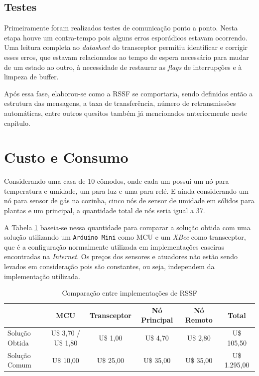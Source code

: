 {\subsection{Testes}
Primeiramente foram realizados testes de comunicação ponto a ponto. Nesta etapa houve um contra-tempo pois
alguns erros esporádicos estavam ocorrendo. Uma leitura completa ao \textit{datasheet} do transceptor permitiu
identificar e corrigir esses erros, que estavam relacionados ao tempo de espera necessário para mudar de um
estado ao outro, à necessidade de restaurar as \textit{flags} de interrupções e à limpeza de buffer.

Após essa fase, elaborou-se como a RSSF se comportaria, sendo definidos então a estrutura das mensagens, a
taxa de transferência, número de retransmissões automáticas, entre outros quesitos também já mencionados
anteriormente neste capítulo.

\section{Custo e Consumo}
Considerando uma casa de 10 cômodos, onde cada um possui um nó para temperatura e umidade, um para luz e uma
para relé. E ainda considerando um nó para sensor de gás na cozinha, cinco nós de sensor de umidade em sólidos
para plantas e um principal, a quantidade total de nós seria igual a 37.

A Tabela \ref{quadro:compare} baseia-se nessa quantidade para comparar a solução obtida com uma solução
utilizando um \texttt{Arduino Mini} como MCU e um \textit{XBee} como transceptor, que é a configuração
normalmente utilizada em implementações caseiras encontradas na \textit{Internet}. Os preços dos sensores e
atuadores não estão sendo levados em consideração pois são constantes, ou seja, independem da implementação
utilizada.

\begin{table}[H]
	\centering
	\resizebox{\textwidth}{!} {
		\begin{tabular}{l|c|c|c|c|c|}
		\cline{2-6}
		& MCU & Transceptor & Nó Principal & Nó Remoto & Total \\ \hline
		\multicolumn{1}{|l|}{Solução Obtida} & U\$ 3,70 / U\$ 1,80 & U\$ 1,00    & U\$ 4,70     & U\$
		2,80  & U\$ 105,50    \\ \hline
		\multicolumn{1}{|l|}{Solução Comum}  & U\$ 10,00         & U\$ 25,00   & U\$ 35,00    & U\$ 35,00 & U\$ 1.295,00 \\ \hline
		\end{tabular}
	}
	\caption{Comparação entre implementações de RSSF}
	\label{quadro:compare}
\end{table}

}
